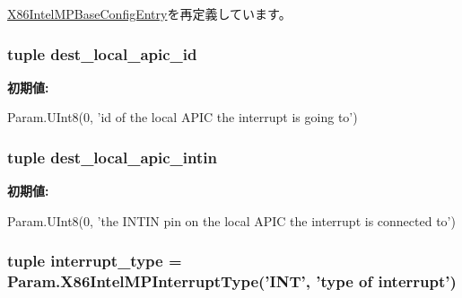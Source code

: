 \hyperlink{classIntelMP_1_1X86IntelMPBaseConfigEntry_a17da7064bc5c518791f0c891eff05fda}{X86IntelMPBaseConfigEntry}を再定義しています。\hypertarget{classIntelMP_1_1X86IntelMPLocalIntAssignment_a246eb9a5858244b91564983b17c42629}{
\subsubsection[{dest\_\-local\_\-apic\_\-id}]{\setlength{\rightskip}{0pt plus 5cm}tuple {\bf dest\_\-local\_\-apic\_\-id}}}
\label{classIntelMP_1_1X86IntelMPLocalIntAssignment_a246eb9a5858244b91564983b17c42629}
{\bfseries 初期値:}
\begin{DoxyCode}
Param.UInt8(0,
            'id of the local APIC the interrupt is going to')
\end{DoxyCode}
\hypertarget{classIntelMP_1_1X86IntelMPLocalIntAssignment_a78c47ead0cdf7830f38b9a797faa102f}{
\subsubsection[{dest\_\-local\_\-apic\_\-intin}]{\setlength{\rightskip}{0pt plus 5cm}tuple {\bf dest\_\-local\_\-apic\_\-intin}}}
\label{classIntelMP_1_1X86IntelMPLocalIntAssignment_a78c47ead0cdf7830f38b9a797faa102f}
{\bfseries 初期値:}
\begin{DoxyCode}
Param.UInt8(0,
            'the INTIN pin on the local APIC the interrupt is connected to')
\end{DoxyCode}
\hypertarget{classIntelMP_1_1X86IntelMPLocalIntAssignment_a47ced18ebb7927f6eede388751a1e331}{
\subsubsection[{interrupt\_\-type}]{\setlength{\rightskip}{0pt plus 5cm}tuple {\bf interrupt\_\-type} = Param.X86IntelMPInterruptType('INT', '{\bf type} of interrupt')}}
